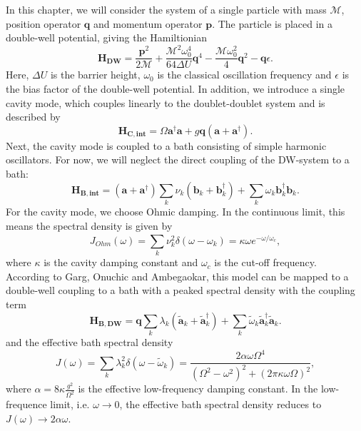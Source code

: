 In this chapter, we will consider the system of a single particle with mass $\mathcal{M}$, 
position operator $\mathbf{q}$ and momentum operator $\mathbf{p}$.
The particle is placed in a double-well potential, giving the Hamiltionian
%
\[ \mathbf{H_{DW}} = \frac{\mathbf{p}^2}{2 \mathcal{M}}  
    + \frac{\mathcal{M}^2 \omega_0^4}{64 \Delta U} \mathbf{q}^4 
    - \frac{\mathcal{M} \omega_0^2}{4} \mathbf{q}^2
    - \mathbf{q} \epsilon . \]
%
Here, $\Delta U$ is the barrier height, $\omega_0$ is the classical oscillation frequency
and $\epsilon$ is the bias factor of the double-well potential.
In addition, we introduce a single cavity mode, which couples linearly to the doublet-doublet
system and is described by
%
\[ \mathbf{H_{C,int}} = \Omega \mathbf{a}^{\dagger} \mathbf{a}
    + g \mathbf{q} \left( \mathbf{a} + \mathbf{a}^{\dagger} \right) . \]
%
Next, the cavity mode is coupled to a bath consisting of simple harmonic oscillators. 
For now, we will neglect the direct coupling of the DW-system to a bath:
%
\[ \mathbf{H_{B,int}} = \left( \mathbf{a} + \mathbf{a}^{\dagger} \right)
    \sum_{k}^{} \nu_k \left( \mathbf{b}_k + \mathbf{b}^{\dagger}_k  \right) 
    + \sum_{k}^{} \omega_k \mathbf{b}^{\dagger}_k  \mathbf{b}_k  . \]
%
For the cavity mode, we choose Ohmic damping. In the continuous limit, this means the 
spectral density is given by
%
\[ J_{Ohm} \left( \omega \right) = \sum_{k}^{} \nu_k^2 \delta\left( \omega - \omega_k \right) 
    = \kappa \omega e^{- \omega / \omega_c} , \]
%
where $\kappa$ is the cavity damping constant and $\omega_c$ is the cut-off frequency. \\
According to Garg, Onuchic and Ambegaokar, this model can be mapped to a double-well 
coupling to a bath with a peaked spectral density with the coupling term
%
\[ \mathbf{H_{B,DW}} = \mathbf{q} \sum_{k}^{} \lambda_k \left( \tilde{\mathbf{a}}_k  + \tilde{\mathbf{a}}^\dagger_k  \right) 
    + \sum_{k}^{}\tilde{\omega}_k \tilde{\mathbf{a}}^\dagger_k  \tilde{\mathbf{a}}_k  . \]
%
and the effective bath spectral density
%
\[ J \left( \omega \right) = \sum_{k}^{} \lambda_k^2 \delta\left( \omega - \tilde{\omega}_k \right) 
    = \frac{2 \alpha \omega \Omega^4}{ \left( \Omega^2 - \omega^2 \right)^2  + \left( 2 \pi \kappa \omega \Omega  \right)^2 } , \]
%
where $\alpha = 8 \kappa \frac{g^2}{\Omega^2}$ is the effective low-frequency damping constant.
In the low-frequence limit, i.e. $\omega \rightarrow 0$, the effective bath spectral
density reduces to $J \left( \omega \right) \rightarrow 2 \alpha \omega$.